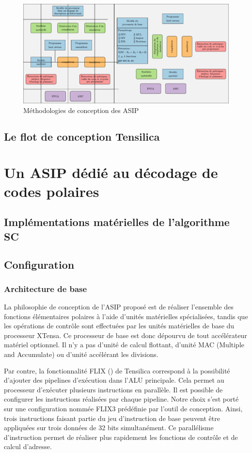\begin{figure}[t]
\centering
\includegraphics[width=\textwidth]{main/ch3_fig/methodos}
\caption{Méthodologies de conception des ASIP}
\end{figure}


\subsection{Le flot de conception Tensilica}
\label{tensilica_design}
\section{Un ASIP dédié au décodage de codes polaires}
\subsection{Implémentations matérielles de l'algorithme SC}
\label{subsec:sota_sc}
\subsection{Configuration}
\subsubsection{Architecture de base}
La philosophie de conception de l'ASIP proposé est de réaliser l'ensemble des fonctions élémentaires polaires à l'aide d'unités matérielles spécialisées, tandis que les opérations de contrôle sont effectuées par les unités matérielles de base du processeur XTensa. Ce processeur de base est donc dépourvu de tout accélérateur matériel optionnel. Il n'y a pas d'unité de calcul flottant, d'unité MAC (Multiple and Accumulate) ou d'unité accélérant les divisions.

Par contre, la fonctionnalité FLIX () de Tensilica correspond à la possibilité d'ajouter des pipelines d'exécution dans l'ALU principale. Cela permet au processeur d'exécuter plusieurs instructions en parallèle. Il est possible de configurer les instructions réalisées par chaque pipeline. Notre choix s'est porté sur une configuration nommée FLIX3 prédéfinie par l'outil de conception. Ainsi, trois instructions faisant partie du jeu d'instruction de base peuvent être appliquées sur trois données de 32 bits simultanément. Ce parallélisme d'instruction permet de réaliser plus rapidement les fonctions de contrôle et de calcul d'adresse. 

